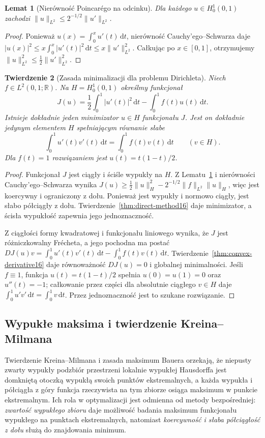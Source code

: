 \documentclass[11pt,a4paper]{article}
\numberwithin{equation}{section}
\theoremstyle{plain}
\newtheorem{twierdzenie}{Twierdzenie}[section]
\newtheorem{lemat}[twierdzenie]{Lemat}
\theoremstyle{definition}
\theoremstyle{remark}
\newcommand{\R}{\mathbb R}
\begin{document}
\begin{lemat}[Nierówność Poincarégo na odcinku]
\label{lem:poincare16}
Dla każdego $u\in H_0^1(0,1)$ zachodzi
$\|u\|_{L^2}\le2^{-1/2}\|u'\|_{L^2}$.
\end{lemat}
\begin{proof}
Ponieważ $u(x)=\int_0^xu'(t)\,\mathrm dt$,
nierówność Cauchy'ego--Schwarza daje
$|u(x)|^2\le x\int_0^x|u'(t)|^2\,\mathrm dt
\le x\|u'\|_{L^2}^2$.
Całkując po $x\in[0,1]$, otrzymujemy
$\|u\|_{L^2}^2\le\frac12\|u'\|_{L^2}^2$.
\end{proof}

\begin{twierdzenie}[Zasada minimalizacji dla problemu Dirichleta]
\label{thm:dirichlet16}
Niech $f\in L^2(0,1;\R)$. Na $H=H_0^1(0,1)$
określmy funkcjonał
\[
J(u)=\frac12\int_0^1|u'(t)|^2\,\mathrm dt
-\int_0^1 f(t)u(t)\,\mathrm dt.
\]
Istnieje dokładnie jeden minimizator $u\in H$ funkcjonału $J$.
Jest on dokładnie jedynym elementem $H$ spełniającym
równanie słabe
\[
\int_0^1u'(t)v'(t)\,\mathrm dt
=\int_0^1f(t)v(t)\,\mathrm dt\qquad(v\in H).
\]
Dla $f(t)=1$ rozwiązaniem jest $u(t)=t(1-t)/2$.
\end{twierdzenie}
\begin{proof}
Funkcjonał $J$ jest ciągły i ściśle wypukły na $H$.
Z Lematu~\ref{lem:poincare16} i nierówności
Cauchy'ego--Schwarza wynika
$J(u)\ge\frac12\|u\|_H^2-
2^{-1/2}\|f\|_{L^2}\|u\|_H$, więc jest koercywny
i ograniczony z dołu. Ponieważ jest wypukły
i normowo ciągły, jest słabo półciągły z dołu.
Twierdzenie~\ref{thm:direct-method16} daje minimizator,
a ścisła wypukłość zapewnia jego jednoznaczność.

Z ciągłości formy kwadratowej i funkcjonału liniowego
wynika, że $J$ jest różniczkowalny Frécheta,
a jego pochodna ma postać
$DJ(u)v=\int_0^1u'(t)v'(t)\,\mathrm dt-
\int_0^1 f(t)v(t)\,\mathrm dt$.
Twierdzenie~\ref{thm:convex-derivative16} daje
równoważność $DJ(u)=0$ i globalnej minimalności.
Jeśli $f\equiv1$, funkcja $u(t)=t(1-t)/2$ spełnia
$u(0)=u(1)=0$ oraz $u''(t)=-1$; całkowanie przez części
dla absolutnie ciągłego $v\in H$ daje
$\int_0^1u'v'\,\mathrm dt=\int_0^1v\,\mathrm dt$.
Przez jednoznaczność jest to szukane rozwiązanie.
\end{proof}

\subsection{Wypukłe maksima i twierdzenie Kreina--Milmana}

Twierdzenie Kreina--Milmana i zasada maksimum Bauera orzekają,
że niepusty zwarty wypukły podzbiór przestrzeni lokalnie wypukłej
Hausdorffa jest domkniętą otoczką wypukłą swoich punktów
ekstremalnych, a każda wypukła i półciągła z góry funkcja
rzeczywista na tym zbiorze osiąga maksimum w punkcie ekstremalnym. Ich rola w optymalizacji jest odmienna od metody bezpośredniej:
\emph{zwartość wypukłego zbioru} daje możliwość badania maksimum
funkcjonału wypukłego na punktach ekstremalnych,
natomiast \emph{koercywność i słaba półciągłość z dołu}
służą do znajdowania minimum.
\end{document}
